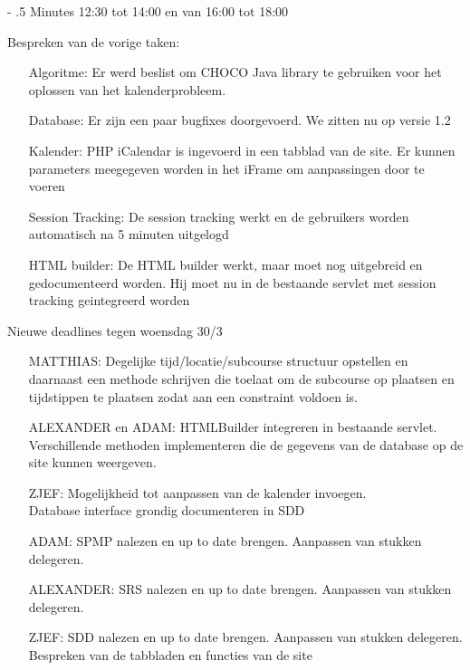 \documentclass{article}
\makeatletter
\renewcommand\paragraph{%
   \@startsection{paragraph}{4}{0mm}%
      {-\baselineskip}%
      {.5\baselineskip}%
      {\normalfont\normalsize\bfseries}}
\makeatother
\begin{document}
\paragraph{Minutes 12:30 tot 14:00 en van 16:00 tot 18:00}

Bespreken van de vorige taken:
\begin{itemize}
	\item[Algoritme:] Er werd beslist om CHOCO Java library te gebruiken voor het oplossen van het kalenderprobleem. 
	\item[Database:] Er zijn een paar bugfixes doorgevoerd. We zitten nu op versie 1.2 
	\item[Kalender:] PHP iCalendar is ingevoerd in een tabblad van de site. Er kunnen parameters meegegeven worden in het iFrame om aanpassingen door te voeren 
	\item[Session Tracking:] De session tracking werkt en de gebruikers worden automatisch na 5 minuten uitgelogd 
	\item[HTML builder:] De HTML builder werkt, maar moet nog uitgebreid en gedocumenteerd worden. Hij moet nu in de bestaande servlet met session tracking geintegreerd worden 
\end{itemize}
Nieuwe deadlines tegen woensdag 30/3
\begin{itemize}
	\item[MATTHIAS:] Degelijke tijd/locatie/subcourse structuur opstellen en daarnaast een methode schrijven die toelaat om de subcourse op plaatsen en tijdstippen te plaatsen zodat aan een constraint voldoen is. 
	\item[ALEXANDER en ADAM:] HTMLBuilder integreren in bestaande servlet. \\
Verschillende methoden implementeren die de gegevens van de database op de site kunnen weergeven. 
	\item[ZJEF:] Mogelijkheid tot aanpassen van de kalender invoegen. \\
Database interface grondig documenteren in SDD 
	\item[ADAM:] SPMP nalezen en up to date brengen. Aanpassen van stukken delegeren. 
	\item[ALEXANDER:] SRS nalezen en up to date brengen. Aanpassen van stukken delegeren. 
	\item[ZJEF:] SDD nalezen en up to date brengen. Aanpassen van stukken delegeren. \\
Bespreken van de tabbladen en functies van de site 
\end{itemize}
\end{document}
